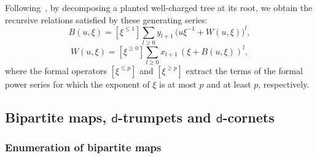 \documentclass[11pt,reqno,tbtags]{amsart}
\numberwithin{equation}{section}
\numberwithin{theo}{section}
\theoremstyle{definition}
\newcommand{\dtrum}{$\mathsf{d}$-trumpet}
\newcommand{\dcorn}{$\mathsf{d}$-cornet}
\begin{document}
Following~\cite{BousquetMelouSchaeffer_Bipartite}, by decomposing a planted well-charged tree at its root, we obtain the recursive relations satisfied by these generating series:
\begin{equation}\label{eq: Recursive eq GF black blossoming trees}
	B(u, \xi) = \left[\xi^{\leq 1}\right] \sum\limits_{l\geq 0}{y_{l+1} \,\big(u\xi^{-1}+W(u, \xi)\big)^l},
\end{equation}
\begin{equation}\label{eq: Recursive eq GF white blossoming trees}
	 W(u, \xi) = \left[\xi^{\geq 0}\right] \sum\limits_{l\geq 0}{x_{l+1}\,(\xi+B(u, \xi))^l},
\end{equation}  
where the formal operators $\left[\xi^{\leq p}\right]$ and $\left[\xi^{\geq p}\right]$ extract the terms of the formal power series for which the exponent of $\xi$ is at most $p$ and at least $p$, respectively. \\	
	
	
	\subsection{Bipartite maps, \dtrum s and \dcorn s} 

		\subsubsection{Enumeration of bipartite maps}\label{sec: bipartite gf}
\end{document}
